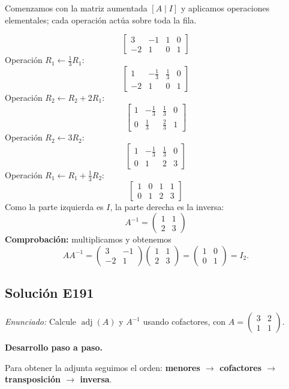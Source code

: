 \documentclass[12pt]{article}
\theoremstyle{remark}
\newcommand{\adj}{\operatorname{adj}}
\newcommand{\solucion}[2]{\Needspace{11\baselineskip}\subsection*{Solución E#1}\noindent\textit{Enunciado:} #2\par\medskip\noindent\textbf{Desarrollo paso a paso.}\par\medskip}
\begin{document}
Comenzamos con la matriz aumentada $[A\mid I]$ y aplicamos operaciones elementales; cada operación actúa sobre toda la fila.

\[
\left[\begin{array}{rr|rr}3&-1&1&0\\-2&1&0&1\end{array}\right]
\]
Operación $R_{1}\leftarrow \frac{1}{3}R_{1}$:
\[
\left[\begin{array}{rr|rr}1&- \frac{1}{3}&\frac{1}{3}&0\\-2&1&0&1\end{array}\right]
\]
Operación $R_{2}\leftarrow R_{2}+2R_{1}$:
\[
\left[\begin{array}{rr|rr}1&- \frac{1}{3}&\frac{1}{3}&0\\0&\frac{1}{3}&\frac{2}{3}&1\end{array}\right]
\]
Operación $R_{2}\leftarrow 3R_{2}$:
\[
\left[\begin{array}{rr|rr}1&- \frac{1}{3}&\frac{1}{3}&0\\0&1&2&3\end{array}\right]
\]
Operación $R_{1}\leftarrow R_{1}+\frac{1}{3}R_{2}$:
\[
\left[\begin{array}{rr|rr}1&0&1&1\\0&1&2&3\end{array}\right]
\]
Como la parte izquierda es $I$, la parte derecha es la inversa:
\[
\boxed{A^{-1}=\begin{pmatrix}1&1\\2&3\end{pmatrix}}
\]
\textbf{Comprobación:} multiplicamos y obtenemos
\[
AA^{-1}=\begin{pmatrix}3&-1\\-2&1\end{pmatrix}\begin{pmatrix}1&1\\2&3\end{pmatrix}=\begin{pmatrix}1&0\\0&1\end{pmatrix}=I_{2}.
\]

\medskip

\solucion{191}{Calcule $\adj(A)$ y $A^{-1}$ usando cofactores, con $A=\begin{pmatrix}3&2\\1&1\end{pmatrix}$.}
Para obtener la adjunta seguimos el orden: \textbf{menores $\to$ cofactores $\to$ transposición $\to$ inversa}.
\end{document}
